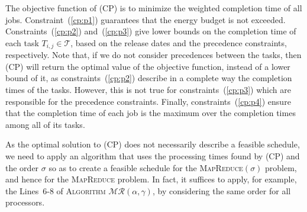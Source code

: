 \documentclass{llncs}
\newcommand{\mr}{\textsc{MapReduce}\xspace}
\newcommand{\mrs}{\textsc{MapReduce$(\sigma)$}\xspace}
\newcommand{\algomr}{\textsc{Algorithm} $\mathcal{MR}(\alpha,\gamma)$\xspace}
\begin{document}
The objective function of (CP) is to minimize the weighted completion time of all jobs.
Constraint~(\ref{cp:p1}) guarantees that the energy budget is not exceeded.
Constraints~(\ref{cp:p2}) and~(\ref{cp:p3}) give lower bounds on the completion time of each task $T_{i,j} \in \mathcal{T}$,
based on the release dates and the precedence constraints, respectively.
Note that, if we do not consider precedences between the tasks,
then (CP) will return the optimal value of the objective function, instead of a lower bound of it,
as constraints~(\ref{cp:p2}) describe in a complete way the completion times of the tasks.
However, this is not true for constraints~(\ref{cp:p3}) which are responsible for the precedence constraints.
Finally, constraints~(\ref{cp:p4}) ensure that the completion time of each job is the maximum over the completion times among all of its tasks.

As the optimal solution to (CP) does not necessarily describe a feasible schedule,
we need to apply an algorithm that uses the processing times found by (CP) and the order $\sigma$ so as to create a feasible schedule for the \mrs problem,
and hence for the \mr problem.
In fact, it suffices to apply, for example, the Lines~6-8 of \algomr, by considering the same order for all processors.
\end{document}
